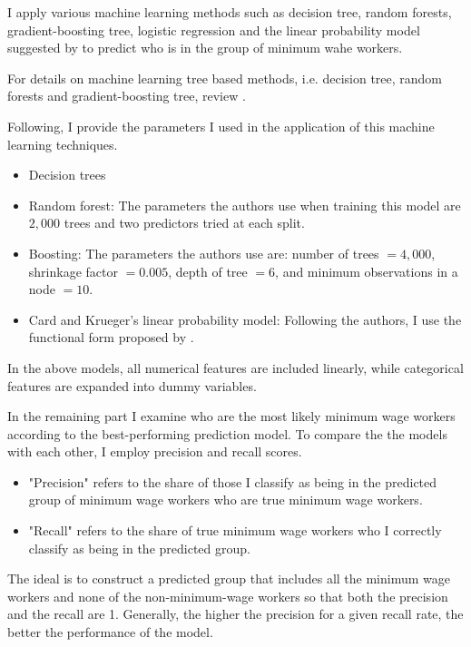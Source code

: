 \documentclass[11pt, a4paper, leqno]{article}
\begin{document}
I apply various machine learning methods such as decision tree, random forests, gradient-boosting tree, 
logistic regression and the linear probability model suggested by \citet{card2016myth} to predict who 
is in the group of minimum wahe workers. 

For details on machine learning tree based methods, i.e. decision tree, 
random forests and gradient-boosting tree, review \citet{hastie2009elements}.

Following, I provide the parameters I used in the application of this machine learning techniques.

\begin{itemize}
\item Decision trees
\item Random forest: The parameters the authors use when training this model are
$2,000$ trees and two predictors tried at each split.
\item Boosting: The parameters the authors use are: number of trees $= 4,000$, 
shrinkage factor $= 0.005$, depth of tree $=6$, and minimum observations in a node $=10$.
\item Card and Krueger's linear probability model: Following the authors, I use 
the functional form proposed by \citet{card2016myth}. 
\end{itemize}

In the above models, all numerical features are included linearly, while categorical features 
are expanded into dummy variables. 

In the remaining part I examine who are the most likely minimum wage workers
according to the best-performing prediction model. To compare the 
the models with each other, I employ precision and recall scores. 
\begin{itemize}
    \item "Precision" refers to the share of those I
    classify as being in the predicted group of minimum wage workers who 
    are true minimum wage workers.
    \item "Recall" refers to the share of true minimum wage workers 
    who I correctly classify as being in the predicted group. 
\end{itemize}

The ideal is to construct a predicted group that includes
all the minimum wage workers and none of the non-minimum-wage
workers so that both the precision and the recall are 1. Generally, the higher
the precision for a given recall rate, the better the performance of the model.
\end{document}

